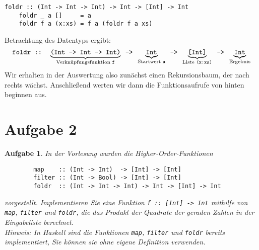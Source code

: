 \documentclass[ngerman, a4paper, 11pt]{article}
\theoremstyle{nonumberplain}
\newtheorem{aufgabe}{Aufgabe}
\begin{document}
\begin{enumerate}[leftmargin=*]
	\begin{lstlisting}[style=frame]
	foldr :: (Int -> Int -> Int) -> Int -> [Int] -> Int
	foldr _ a []     = a
	foldr f a (x:xs) = f a (foldr f a xs)
	\end{lstlisting}
	Betrachtung des Datentyps ergibt:
	\begin{equation*}
	\texttt{foldr :: } \underbrace{\texttt{(Int -> Int -> Int)}}_{\text{Verknüpfungsfunktion \texttt{f}}} \texttt{ -> } \underbrace{\texttt{Int}}_{\text{Startwert \texttt{a}}} \texttt{ -> } \underbrace{\texttt{[Int]}}_{\text{Liste \texttt{(x:xs)}}} \texttt{ -> } \underbrace{\texttt{Int}}_{\text{Ergebnis}}
	\end{equation*}
	Wir erhalten in der Auswertung also zunächst einen Rekursionsbaum, der nach rechts wächst. Anschließend werten wir dann die Funktionsaufrufe von hinten beginnen aus.
\end{enumerate}

\section*{Aufgabe 2}

\begin{aufgabe}
	In der Vorlesung wurden die Higher-Order-Funktionen
	\begin{lstlisting}
		map    :: (Int -> Int)  -> [Int] -> [Int]
		filter :: (Int -> Bool) -> [Int] -> [Int]
		foldr  :: (Int -> Int -> Int) -> Int -> [Int] -> Int
	\end{lstlisting}
	vorgestellt. Implementieren Sie eine Funktion \texttt{f :: [Int] -> Int} mithilfe von \texttt{map}, \texttt{filter} und \texttt{foldr}, die das Produkt der Quadrate der geraden Zahlen in der Eingabeliste berechnet. \\
	\textit{Hinweis: In Haskell sind die Funktionen \texttt{map}, \texttt{filter} und \texttt{foldr} bereits implementiert, Sie können sie ohne eigene Definition verwenden.}

\end{aufgabe}
\end{document}
